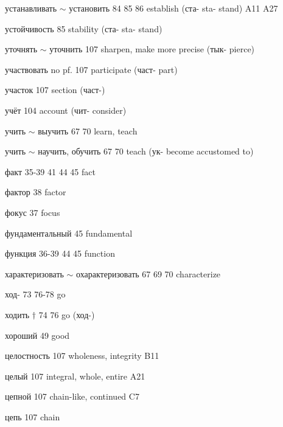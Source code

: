 \begin{minipage}[t]{0.475\textwidth}
\raggedright
\noindent устанавливать $\sim$ установить 84 85 86 establish (ста- sta- stand) A11 A27\par
\noindent устойчивость 85 stability (ста- sta- stand)\par
\noindent уточнять $\sim$ уточнить 107 sharpen, make more precise (тык- pierce)\par
\noindent участвовать no pf. 107 participate (част- part)\par
\noindent участок 107 section (част-)\par
\noindent учёт 104 account (чит- consider)\par
\noindent учить $\sim$ выучить 67 70 learn, teach\par
\noindent учить $\sim$ научить, обучить 67 70 teach (ук- become accustomed to)\par
\noindent факт 35-39 41 44 45 fact\par
\noindent фактор 38 factor\par
\noindent фокус 37 focus\par
\noindent фундаментальный 45 fundamental\par
\noindent функция 36-39 44 45 function\par
\noindent характеризовать $\sim$ охарактеризовать 67 69 70 characterize\par
\noindent ход- 73 76-78 go\par
\noindent ходить $\dagger$ 74 76 go (ход-)\par
\noindent хороший 49 good\par
\noindent целостность 107 wholeness, integrity B11\par
\noindent целый 107 integral, whole, entire A21\par
\noindent цепной 107 chain-like, continued C7\par
\noindent цепь 107 chain\par
\end{minipage}
\endgroup
\clearpage
\thispagestyle{plain}
\begingroup
\cyrillicfont
\fontsize{7.25}{8.25}\selectfont
\setlength{\parindent}{0pt}
\setlength{\parskip}{0pt}
\setlength{\emergencystretch}{1.5em}
\noindent
